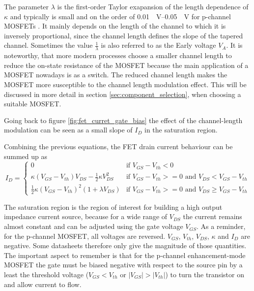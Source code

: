 The parameter $\lambda$ is the first-order Taylor exapansion of the length dependence of $\kappa$ and typically is small and on the order of \qtyrange[range-units = single, per-mode=power]{0.01}{0.05}{\per \volt} for p-channel MOSFETs \citep[p. 23]{mosfet_flicker_noise}. It mainly depends on the length of the channel to which it is inversely proportional, since the channel length defines the slope of the tapered channel. Sometimes the value $\frac{1}{\lambda}$ is also referred to as the Early voltage $V_A$. It is noteworthy, that more modern processes choose a smaller channel length to reduce the on-state resistance of the MOSFET because the main application of a MOSFET nowadays is as a switch. The reduced channel length makes the MOSFET more susceptible to the channel length modulation effect. This will be discussed in more detail in section \ref{sec:component_selection}, when choosing a suitable MOSFET.

Going back to figure \ref{fig:fet_curret_gate_bias} the effect of the channel-length modulation can be seen as a small slope of $I_D$ in the saturation region.

Combining the previous equations, the FET drain current behaviour can be summed up as
\begin{equation}
    I_D = \begin{cases}
        0 & \text{if } V_{GS} - V_{th} < 0\\
        \kappa (V_{GS} - V_{th}) V_{DS} - \frac 1 2 \kappa V_{DS}^2 & \text{if } V_{GS} - V_{th} >= 0 \text{ and } V_{DS} < V_{GS} - V_{th}\\
        \frac 1 2 \kappa \left(V_{GS} - V_{th} \right)^2 (1 + \lambda V_{DS}) & \text{if } V_{GS} - V_{th} >= 0 \text{ and } V_{DS} \geq V_{GS} - V_{th}
    \end{cases}
    \label{eqn:mosfet_id_large_signal}
\end{equation}

The saturation region is the region of interest for building a high output impedance current source, because for a wide range of $V_{DS}$ the current remains almost constant and can be adjusted using the gate voltage $V_{GS}$. As a reminder, for the p-channel MOSFET, all voltages are reversed. $V_{GS}$, $V_{th}$, $V_{DS}$, $\kappa$ and $I_D$ are negative. Some datasheets therefore only give the magnitude of those quantities. The important aspect to remember is that for the p-channel enhancement-mode MOSFET the gate must be biased negative with respect to the source pin by a least the threshold voltage ($V_{GS} < V_{th}$ or $|V_{GS}| > |V_{th}|$) to turn the transistor on and allow current to flow.

